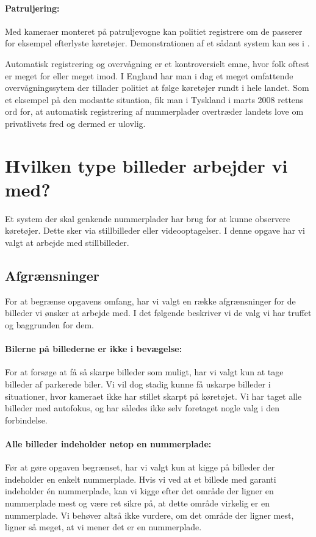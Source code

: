 \paragraph{Patruljering:}
Med kameraer monteret på patruljevogne kan politiet registrere om de passerer for eksempel efterlyste køretøjer. Demonstrationen af et sådant system kan ses i \cite{canada_demo}. 

Automatisk registrering og overvågning er et kontroversielt emne, hvor folk oftest er meget for eller meget imod. I England har man i dag et meget omfattende overvågningssytem der tillader politiet at følge køretøjer rundt i hele landet\cite{wiki_baggrund}. Som et eksempel på den modsatte situation, fik man i Tyskland i marts 2008 rettens ord for, at automatisk registrering af nummerplader overtræder landets love om privatlivets fred og dermed er ulovlig\cite{tysk_ulovlig}.



\section{Hvilken type billeder arbejder vi med?}
\label{sec:data}
Et system der skal genkende nummerplader har brug for at kunne observere køretøjer. Dette sker via stillbilleder eller videooptagelser. I denne opgave har vi valgt at arbejde med stillbilleder.

\subsection{Afgrænsninger}
For at begrænse opgavens omfang, har vi valgt en række afgrænsninger for de billeder vi ønsker at arbejde med. I det følgende beskriver vi de valg vi har truffet og baggrunden for dem.

\paragraph{Bilerne på billederne er ikke i bevægelse:}
For at forsøge at få så skarpe billeder som muligt, har vi valgt kun at tage billeder af parkerede biler. Vi vil dog stadig kunne få uskarpe billeder i situationer, hvor kameraet ikke har stillet skarpt på køretøjet. Vi har taget alle billeder med autofokus, og har således ikke selv foretaget nogle valg i den forbindelse.

\paragraph{Alle billeder indeholder netop en nummerplade:}
Før at gøre opgaven begrænset, har vi valgt kun at kigge på billeder der indeholder en enkelt nummerplade. Hvis vi ved at et billede med garanti indeholder én nummerplade, kan vi kigge efter det område der ligner en nummerplade mest og være ret sikre på, at dette område virkelig er en nummerplade. Vi behøver altså ikke vurdere, om det område der ligner mest, ligner så meget, at vi mener det er en nummerplade.

